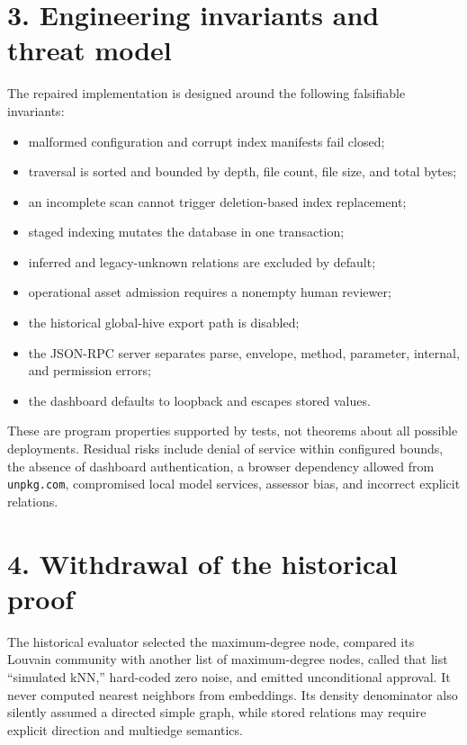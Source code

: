\documentclass[
  english,
  11pt,
]{article}
\providecommand{\tightlist}{%
  \setlength{\itemsep}{0pt}\setlength{\parskip}{0pt}}
\begin{document}
\section{3. Engineering invariants and threat
model}\label{engineering-invariants-and-threat-model}

The repaired implementation is designed around the following falsifiable
invariants:

\begin{itemize}
\tightlist
\item
  malformed configuration and corrupt index manifests fail closed;
\item
  traversal is sorted and bounded by depth, file count, file size, and
  total bytes;
\item
  an incomplete scan cannot trigger deletion-based index replacement;
\item
  staged indexing mutates the database in one transaction;
\item
  inferred and legacy-unknown relations are excluded by default;
\item
  operational asset admission requires a nonempty human reviewer;
\item
  the historical global-hive export path is disabled;
\item
  the JSON-RPC server separates parse, envelope, method, parameter,
  internal, and permission errors;
\item
  the dashboard defaults to loopback and escapes stored values.
\end{itemize}

These are program properties supported by tests, not theorems about all
possible deployments. Residual risks include denial of service within
configured bounds, the absence of dashboard authentication, a browser
dependency allowed from \texttt{unpkg.com}, compromised local model
services, assessor bias, and incorrect explicit relations.

\section{4. Withdrawal of the historical
proof}\label{withdrawal-of-the-historical-proof}

The historical evaluator selected the maximum-degree node, compared its
Louvain community with another list of maximum-degree nodes, called that
list ``simulated kNN,'' hard-coded zero noise, and emitted unconditional
approval. It never computed nearest neighbors from embeddings. Its
density denominator also silently assumed a directed simple graph, while
stored relations may require explicit direction and multiedge semantics.
\end{document}
